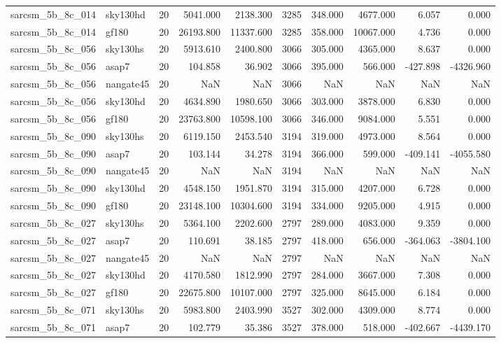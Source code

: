 \begin{tabular}{llrrrrrrrr}
sarcsm\_5b\_8c\_014 & sky130hd & 20 & 5041.000 & 2138.300 & 3285 & 348.000 & 4677.000 & 6.057 & 0.000 \\
sarcsm\_5b\_8c\_014 & gf180 & 20 & 26193.800 & 11337.600 & 3285 & 358.000 & 10067.000 & 4.736 & 0.000 \\
sarcsm\_5b\_8c\_056 & sky130hs & 20 & 5913.610 & 2400.800 & 3066 & 305.000 & 4365.000 & 8.637 & 0.000 \\
sarcsm\_5b\_8c\_056 & asap7 & 20 & 104.858 & 36.902 & 3066 & 395.000 & 566.000 & -427.898 & -4326.960 \\
sarcsm\_5b\_8c\_056 & nangate45 & 20 & NaN & NaN & 3066 & NaN & NaN & NaN & NaN \\
sarcsm\_5b\_8c\_056 & sky130hd & 20 & 4634.890 & 1980.650 & 3066 & 303.000 & 3878.000 & 6.830 & 0.000 \\
sarcsm\_5b\_8c\_056 & gf180 & 20 & 23763.800 & 10598.100 & 3066 & 346.000 & 9084.000 & 5.551 & 0.000 \\
sarcsm\_5b\_8c\_090 & sky130hs & 20 & 6119.150 & 2453.540 & 3194 & 319.000 & 4973.000 & 8.564 & 0.000 \\
sarcsm\_5b\_8c\_090 & asap7 & 20 & 103.144 & 34.278 & 3194 & 366.000 & 599.000 & -409.141 & -4055.580 \\
sarcsm\_5b\_8c\_090 & nangate45 & 20 & NaN & NaN & 3194 & NaN & NaN & NaN & NaN \\
sarcsm\_5b\_8c\_090 & sky130hd & 20 & 4548.150 & 1951.870 & 3194 & 315.000 & 4207.000 & 6.728 & 0.000 \\
sarcsm\_5b\_8c\_090 & gf180 & 20 & 23148.100 & 10304.600 & 3194 & 334.000 & 9205.000 & 4.915 & 0.000 \\
sarcsm\_5b\_8c\_027 & sky130hs & 20 & 5364.100 & 2202.600 & 2797 & 289.000 & 4083.000 & 9.359 & 0.000 \\
sarcsm\_5b\_8c\_027 & asap7 & 20 & 110.691 & 38.185 & 2797 & 418.000 & 656.000 & -364.063 & -3804.100 \\
sarcsm\_5b\_8c\_027 & nangate45 & 20 & NaN & NaN & 2797 & NaN & NaN & NaN & NaN \\
sarcsm\_5b\_8c\_027 & sky130hd & 20 & 4170.580 & 1812.990 & 2797 & 284.000 & 3667.000 & 7.308 & 0.000 \\
sarcsm\_5b\_8c\_027 & gf180 & 20 & 22675.800 & 10107.000 & 2797 & 325.000 & 8645.000 & 6.184 & 0.000 \\
sarcsm\_5b\_8c\_071 & sky130hs & 20 & 5983.800 & 2403.990 & 3527 & 302.000 & 4309.000 & 8.774 & 0.000 \\
sarcsm\_5b\_8c\_071 & asap7 & 20 & 102.779 & 35.386 & 3527 & 378.000 & 518.000 & -402.667 & -4439.170 \\

\end{tabular}
